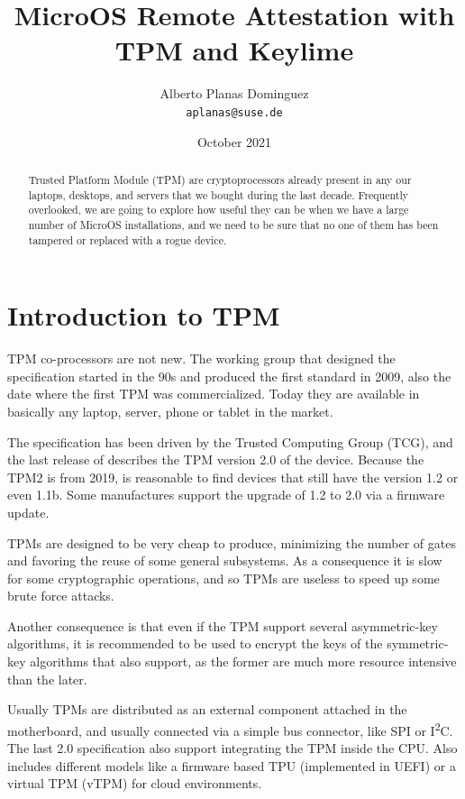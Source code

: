 \documentclass{article}
\title{MicroOS Remote Attestation with TPM and Keylime}
\author{Alberto Planas Dominguez \\ \texttt{aplanas@suse.de}}
\date{October 2021}
\begin{document}
\maketitle

\begin{abstract}
  Trusted Platform Module (TPM) are cryptoprocessors already present
  in any our laptops, desktops, and servers that we bought during the
  last decade.  Frequently overlooked, we are going to explore how
  useful they can be when we have a large number of MicroOS
  installations, and we need to be sure that no one of them has been
  tampered or replaced with a rogue device.
\end{abstract}

\section{Introduction to TPM}
TPM co-processors are not new.  The working group that designed the
specification started in the 90s and produced the first standard in
2009, also the date where the first TPM was commercialized.  Today
they are available in basically any laptop, server, phone or tablet in
the market.

The specification has been driven by the Trusted Computing Group
(TCG)\cite{tcg}, and the last release of describes the TPM version 2.0
of the device\cite{tpm2}.  Because the TPM2 is from 2019, is
reasonable to find devices that still have the version 1.2 or even
1.1b.  Some manufactures support the upgrade of 1.2 to 2.0 via a
firmware update.

TPMs are designed to be very cheap to produce, minimizing the number
of gates and favoring the reuse of some general subsystems.  As a
consequence it is slow for some cryptographic operations, and so TPMs
are useless to speed up some brute force attacks.

Another consequence is that even if the TPM support several
asymmetric-key algorithms, it is recommended to be used to encrypt the
keys of the symmetric-key algorithms that also support, as the former
are much more resource intensive than the later.

Usually TPMs are distributed as an external component attached in the
motherboard, and usually connected via a simple bus connector, like
SPI or I\textsuperscript{2}C.  The last 2.0 specification also support
integrating the TPM inside the CPU.  Also includes different models
like a firmware based TPU (implemented in UEFI) or a virtual TPM
(vTPM) for cloud environments.
\end{document}
